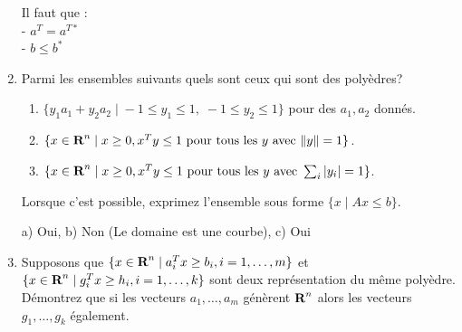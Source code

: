 \begin{enumerate}
    \begin{solution}
      Il faut que : \\
      - $a^{T} = a^{T*}$ \\
      - $ b \le b^{*}$ \\
    \end{solution}

  \item Parmi les ensembles suivants quels sont ceux qui sont des poly\`edres?

    \begin{enumerate}

      \item $\{y_1 a_1 + y_2 a_2 \; | \; -1 \leq y_1 \leq 1, \; -1 \leq y_2 \leq 1 \}$ pour des $a_1, a_2$
        donnés.

      \item $\{x \in {\mbox{\bf R}}^n \; | \; x \geq 0, x^T y \leq 1 \mbox{ pour tous les } y \mbox{ avec } \| y \| =1 \}$.

      \item $\{x \in {\mbox{\bf R}}^n \; | \; x \geq 0, x^T y \leq 1 \mbox{ pour tous les } y \mbox{ avec } \sum_i |y_i | =1 \}$.

    \end{enumerate}

    Lorsque c'est possible, exprimez l'ensemble sous forme $\{x \; | \; Ax \leq b\}$.



    \begin{solution}
      a) Oui, b) Non (Le domaine est une courbe), c) Oui \\
    \end{solution}

  \item Supposons que $\{ x \in {\mbox{\bf R}}^n \; | \; a_i^Tx \geq b_i, i=1, \ldots, m \}$ et $\{ x \in {\mbox{\bf R}}^n \; | \; g_i^Tx \geq h_i,
    i=1, \ldots, k \}$ sont deux représentation du même poly\`edre. Démontrez que si les vecteurs $a_1, \ldots, a_m$ génèrent
    ${\mbox{\bf R}}^n$ alors les vecteurs $g_1, \ldots, g_k$ également.








\end{enumerate}
